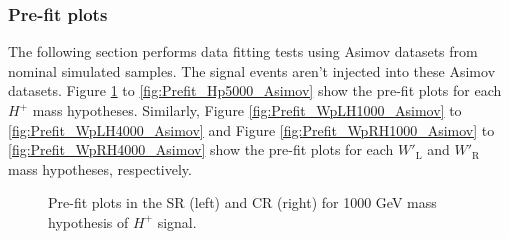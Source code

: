 \subsubsection{Pre-fit plots}
\label{subsubsec:PrefitPlotsForAsimov}
The following section performs data fitting tests using Asimov datasets from nominal simulated samples. The signal events aren't injected into these Asimov datasets. Figure \ref{fig:Prefit_Hp1000_Asimov} to \ref{fig:Prefit_Hp5000_Asimov} show the pre-fit plots for each $H^{+}$ mass hypotheses. Similarly,  Figure \ref{fig:Prefit_WpLH1000_Asimov} to \ref{fig:Prefit_WpLH4000_Asimov} and  Figure \ref{fig:Prefit_WpRH1000_Asimov} to \ref{fig:Prefit_WpRH4000_Asimov} show the pre-fit plots for each $W'_{\text{L}}$ and $W'_{\text{R}}$ mass hypotheses, respectively.

\begin{figure}[H]
  \centering
  \caption{Pre-fit plots in the SR (left) and CR (right) for 1000 GeV mass hypothesis of $H^{+}$ signal.}
  \label{fig:Prefit_Hp1000_Asimov}
\end{figure}
